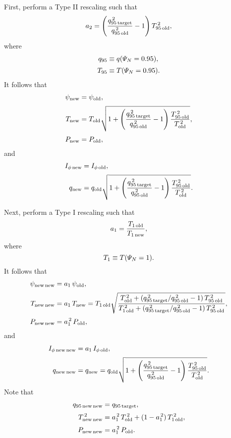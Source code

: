 \documentclass[12pt]{article}
\begin{document}
First, perform a Type II rescaling such that 
\begin{equation}
a_2 = \left(\frac{q_{95\,{\rm target}}^{\,2}}{q_{95\,{\rm old}}^{\,2}}-1\right)T_{95\,{\rm old}}^{\,2},
\end{equation}
where
\begin{align}
q_{95} &\equiv q({\mit\Psi}_N=0.95),\\[0.5ex]
T_{95}&\equiv T({\mit\Psi}_N=0.95).
\end{align}
It follows that
\begin{align}
\psi_{\rm new} &= \psi_{\rm old},\\[0.5ex]
T_{\rm new} & =T_{\rm old}\sqrt{1 +\left(\frac{q_{95\,{\rm target}}^{\,2}}{q_{95\,{\rm old}}^{\,2}}-1\right)\frac{T_{95\,{\rm old}}^{\,2}}{T_{\rm old}^{\,2}}},\\[0.5ex]
P_{\rm new} &= P_{\rm old},
\end{align}
and
\begin{align}
I_{\phi\,{\rm new}} &=I_{\phi\,{\rm old}},\\[0.5ex]
q_{\rm new} &= q_{\rm old}\sqrt{1 +\left(\frac{q_{95\,{\rm target}}^{\,2}}{q_{95\,{\rm old}}^{\,2}}-1\right)\frac{T_{95\,{\rm old}}^{\,2}}{T_{\rm old}^{\,2}}}.
\end{align} 

Next, perform a Type I rescaling such that 
\begin{equation}
a_1 = \frac{T_{1\,{\rm old}}}{T_{1\,{\rm new}}},
\end{equation}
where 
\begin{equation}
T_{1}\equiv  T({\mit\Psi}_N=1).
\end{equation}
It follows that 
\begin{align}
\psi_{\rm new\,new} &= a_1\,\psi_{\rm old},\\[0.5ex]
T_{\rm new\,new} &=a_1\,T_{\rm new} = T_{1\,{\rm old}}
\sqrt{
\frac{T_{\rm old}^{\,2} + (q_{95\,{\rm target}}^{\,2}/q_{95\,{\rm old}}^{\,2}-1)\,T_{95\,{\rm old}}^{\,2}}
{T_{1\,{\rm old}}^{\,2} + (q_{95\,{\rm target}}^{\,2}/q_{95\,{\rm old}}^{\,2}-1)\,T_{95\,{\rm old}}^{\,2}}
},
\\[0.5ex]
P_{\rm new\,new} &=a_1^{\,2}\,P_{\rm old},
\end{align}
and
\begin{align}
I_{\phi\,{\rm new\,new}} &= a_1\,I_{\phi\,{\rm old}},\\[0.5ex]
q_{\rm new\,new} &= q_{\rm new}= q_{\rm old}\sqrt{1 +\left(\frac{q_{95\,{\rm target}}^{\,2}}{q_{95\,{\rm old}}^{\,2}}-1\right)\frac{T_{95\,{\rm old}}^{\,2}}{T_{\rm old}^{\,2}}}.
\end{align}
Note that
\begin{align}
q_{95\,{\rm new\,new}} &= q_{95\,{\rm target}},\\[0.5ex]
T_{{\rm new\,new}}^{\,2} &= a_1^{\,2}\,T_{{\rm old}}^{\,2} + (1-a_1^{\,2})\,T_{1\,{\rm old}}^{\,2},\\[0.5ex]
P_{\rm new\,new} &=a_1^{\,2}\,P_{\rm old}.
\end{align}
\end{document}
